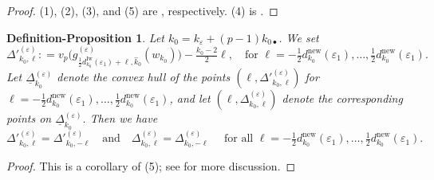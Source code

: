 \documentclass[12pt]{amsart}
\newtheorem{definition-proposition}[subsection]{Definition-Proposition}
\theoremstyle{definition}
\numberwithin{equation}{subsection}
\newcommand{\new}{\mathrm{new}}
\newcommand{\Iw}{\mathrm{Iw}}
\begin{document}
\begin{proof}
(1), (2), (3), and (5) are \cite[Proposition~4.18(1)(2)(3)(4)]{liu-truong-xiao-zhao}, respectively. (4) is \cite[Proposition~4.28]{liu-truong-xiao-zhao}.
\end{proof}

\begin{definition-proposition}\label{DP:definition of Delta' and ghost duality alternative}
Let ${k_0} = k_\varepsilon + (p-1)k_{0\bullet}$.  We set
\begin{equation}
\label{E:definition of Delta'}
\Delta'^{(\varepsilon)}_{k_0, \ell} : = v_p \big(g^{(\varepsilon)}_{\frac 12 d_{k_0}^\Iw(\varepsilon_1)+\ell, \hat k_0}(w_{k_0}) \big) -\tfrac{k_0-2}2 \ell, \quad \textrm{for }\ell = -\tfrac 12 d_{k_0}^\new(\varepsilon_1),\dots, \tfrac 12d_{k_0}^{\new}(\varepsilon_1).
\end{equation}
Let $\underline \Delta_{k_0}^{(\varepsilon)}$ denote the convex hull of the points $(\ell, \Delta'^{(\varepsilon)}_{k_0,\ell})$ for $\ell = -\frac 12 d_{k_0}^\new(\varepsilon_1), \dots, \frac 12d_{k_0}^\new(\varepsilon_1)$, and let $(\ell, \Delta^{(\varepsilon)}_{k_0, \ell})$ denote the corresponding points on $\underline \Delta^{(\varepsilon)}_{k_0}$. Then we have
\begin{equation}
\label{E:ghost duality alternative}
\Delta'^{(\varepsilon)}_{k_0,\ell} = \Delta'^{(\varepsilon)}_{{k_0}, -\ell} \quad \textrm{and}\quad \Delta^{(\varepsilon)}_{k_0,\ell} = \Delta^{(\varepsilon)}_{{k_0}, -\ell} \quad\textrm{ for all }\ell = -\tfrac 12 d_{k_0}^\new(\varepsilon_1), \dots, \tfrac 12d_{k_0}^{\new}(\varepsilon_1).
\end{equation}
\end{definition-proposition}

\begin{proof}
This is a corollary of (5); see \cite[Notation~5.1]{liu-truong-xiao-zhao} for more discussion.
\end{proof}
\end{document}
